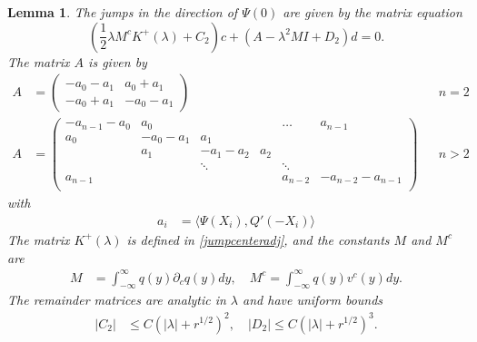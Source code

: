 \documentclass[10pt,reqno]{amsart}
\theoremstyle{plain}
\newtheorem{lemma}[theorem]{Lemma}
\theoremstyle{definition}
\theoremstyle{remark}
\numberwithin{theorem}{section}
\numberwithin{equation}{section}
\begin{document}
\begin{lemma}\label{jumpadj}
The jumps in the direction of $\Psi(0)$ are given by the matrix equation
\begin{equation}\label{Psimatrix}
\left( \frac{1}{2} \lambda M^c K^+(\lambda) + C_2 \right)c + \left(A - \lambda^2 M I + D_2\right)d = 0.
\end{equation}
The matrix $A$ is given by
\begin{align*}
A &= \begin{pmatrix}
-a_0 -a_1 & a_0 + a_1  \\
-a_0 + a_1 & -a_0 - a_1
\end{pmatrix} && n = 2 \\
A &= \begin{pmatrix}
-a_{n-1} - a_0 & a_0 & & & \dots & a_{n-1}\\
a_0 & -a_0 - a_1 &  a_1   \\
& a_1 & -a_1 - a_2 &  a_2 \\
& & \ddots & & \ddots \\
a_{n-1} & & & & a_{n-2} & -a_{n-2} - a_{n-1} \\
\end{pmatrix} && n > 2
\end{align*}
with
\begin{align*}
a_i &= \langle \Psi(X_i), Q'(-X_i) \rangle
\end{align*}
The matrix $K^+(\lambda)$ is defined in \cref{jumpcenteradj}, and the constants $M$ and $M^c$ are
\begin{align*}
M &= \int_{-\infty}^\infty q(y) \partial_c q(y) dy, \quad
M^c = \int_{-\infty}^\infty q(y) v^c(y) dy.
\end{align*}
The remainder matrices are analytic in $\lambda$ and have uniform bounds
\begin{align}\label{adjjumprem}
|C_2| &\leq C (|\lambda| + r^{1/2})^2, \quad
|D_2| \leq C (|\lambda| + r^{1/2})^3.
\end{align}


\end{lemma}
\end{document}
